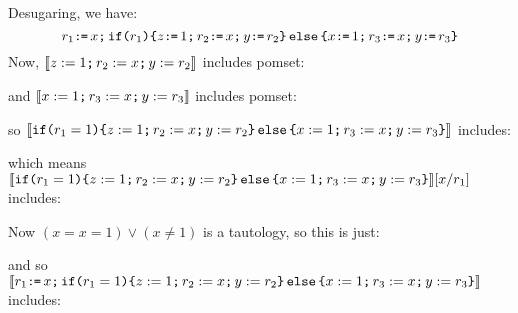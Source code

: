 Desugaring, we have:
\begin{displaymath}
  r_1 \GETS x\SEMI \IF{r_1} \THEN
    z \GETS 1\SEMI r_2 \GETS x\SEMI y \GETS r_2
  \ELSE
    x \GETS 1\SEMI r_3 \GETS x\SEMI y \GETS r_3
  \FI
\end{displaymath}
Now, $\sem{z := 1\SEMI r_2 := x\SEMI y := r_2}$
includes pomset:
\begin{tikzdisplay}[node distance=1em]
\end{tikzdisplay}
and $\sem{x := 1\SEMI r_3 := x\SEMI y := r_3}$
includes pomset:
\begin{tikzdisplay}[node distance=1em]
\end{tikzdisplay}
so  $\sem{\IF{r_1 = 1} \THEN z := 1\SEMI r_2 := x\SEMI y := r_2 \ELSE x := 1\SEMI r_3 := x\SEMI y := r_3 \FI}$ includes:
\begin{tikzdisplay}[node distance=1em]
\end{tikzdisplay}
which means $\sem{\IF{r_1 = 1} \THEN z := 1\SEMI r_2 := x\SEMI y := r_2 \ELSE x := 1\SEMI r_3 := x\SEMI y := r_3 \FI}[x/r_1]$ includes:
\begin{tikzdisplay}[node distance=1em]
\end{tikzdisplay}
Now $(x=x=1) \lor (x\neq1)$ is a tautology, so this is just:
\begin{tikzdisplay}[node distance=1em]
\end{tikzdisplay}
and so $\sem{r_1 \GETS x\SEMI \IF{r_1 = 1} \THEN z := 1\SEMI r_2 := x\SEMI y := r_2 \ELSE x := 1\SEMI r_3 := x\SEMI y := r_3 \FI}$ includes:
\begin{tikzdisplay}[node distance=1em]
\end{tikzdisplay}
